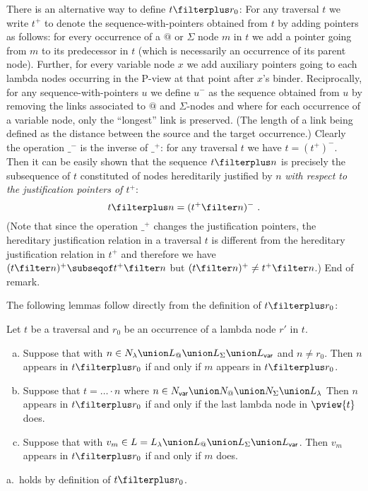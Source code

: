 \begin{remark}
\label{rem:tplus} There is an alternative way to define $t \filterplus r_0$: For any traversal $t$ we write $t^+$ to denote the sequence-with-pointers obtained from $t$ by adding pointers as follows: for every occurrence of a $@$ or $\Sigma$ node $m$ in $t$ we add a pointer going from $m$ to its predecessor in $t$ (which is necessarily an occurrence of its parent node). Further, for every variable node $x$ we add auxiliary pointers going to each lambda nodes occurring in the P-view at that point after $x$'s binder. Reciprocally, for any sequence-with-pointers $u$ we define $u^-$ as the sequence obtained from $u$ by removing the links associated to $@$ and $\Sigma$-nodes and where for each occurrence of a variable node, only the ``longest'' link is preserved. (The length of a link being defined as the distance between the source and the target occurrence.) Clearly the operation $\_^-$ is the inverse of $\_^+$: for any traversal $t$ we have $t= (t^+)^-$.
Then it can be easily shown that the sequence $t \filterplus n$ is
precisely the subsequence of $t$ constituted of nodes hereditarily
justified by $n$ \emph{with respect to the justification pointers of
$t^+$}:
$$t \filterplus n = (t^+ \filter n)^- \ .$$
(Note that since the operation $\_^+$ changes the justification pointers, the hereditary justification relation in a traversal $t$ is different from the hereditary justification relation in $t^+$ and therefore we have $(t\filter n)^+ \subseqof t^+ \filter n$ but $(t\filter n)^+ \neq t^+ \filter n$.) End of remark.
\end{remark}
\bigskip


The following lemmas follow directly from the definition of
$t\filterplus r_0$:
\begin{lemma}
\label{lem:ifin_projplus_so_does_justifier} Let $t$ be a traversal
and  $r_0$ be an occurrence of a lambda node $r'$ in $t$.
\begin{enumerate}[a.]
  \item Suppose that  with $n \in N_\lambda \union L_@ \union L_\Sigma \union L_{\sf
var}$ and $n \neq r_0$. Then $n$ appears in $t\filterplus r_0$ if
and only if $m$ appears in $t\filterplus r_0$.

  \item Suppose that $t = \ldots \cdot n$ where $n\in N_{\sf var}\union N_@\union
N_\Sigma\union L_\lambda$
    Then $n$ appears in $t\filterplus r_0$ if and only if the
    last lambda node in $\pview{t}$ does.

    \item Suppose that  with $v_m \in L = L_\lambda \union L_@ \union L_\Sigma \union L_{\sf
var}$. Then $v_m$ appears in $t\filterplus r_0$ if and only if
$m$ does.
\end{enumerate}
\end{lemma}
\proof a.\ holds by definition of $t\filterplus r_0$.


